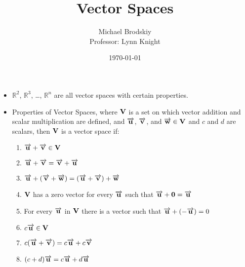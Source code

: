 \documentclass[12pt]{article}
\title{Vector Spaces}
\date{\today}
\author{Michael Brodskiy\\ \small Professor: Lynn Knight}
\begin{document}
\maketitle

\begin{itemize}

  \item $\mathbb{R}^2$, $\mathbb{R}^3$, \dots, $\mathbb{R}^n$ are all vector spaces with certain properties.

  \item Properties of Vector Spaces, where $\bold{V}$ is a set on which vector addition and scalar multiplication are defined, and $\overrightarrow{\bold{u}}$, $\overrightarrow{\bold{v}}$, and $\overrightarrow{\bold{w}} \in \bold{V}$ and $c$ and $d$ are scalars, then $\bold{V}$ is a vector space if:

    \begin{enumerate}

      \item $\overrightarrow{\bold{u}} + \overrightarrow{\bold{v}} \in \bold{V}$

      \item $\overrightarrow{\bold{u}} + \overrightarrow{\bold{v}} = \overrightarrow{\bold{v}} + \overrightarrow{\bold{u}}$

      \item $\overrightarrow{\bold{u}} + (\overrightarrow{\bold{v}} + \overrightarrow{\bold{w}})=(\overrightarrow{\bold{u}} + \overrightarrow{\bold{v}}) + \overrightarrow{\bold{w}}$

      \item  $\bold{V}$ has a zero vector for every $\overrightarrow{\bold{u}}$ such that $\overrightarrow{\bold{u}} + \bold{0} =\overrightarrow{\bold{u}}$

      \item For every $\overrightarrow{\bold{u}}$ in $\bold{V}$ there is a vector such that $\overrightarrow{\bold{u}} + (-\overrightarrow{\bold{u}})=0$

      \item $c\overrightarrow{\bold{u}} \in \bold{V}$ 

      \item $c(\overrightarrow{\bold{u}} + \overrightarrow{\bold{v}})= c\overrightarrow{\bold{u}}+c\overrightarrow{\bold{v}}$

      \item $(c+d)\overrightarrow{\bold{u}}=c\overrightarrow{\bold{u}}+d\overrightarrow{\bold{u}}$


\end{enumerate}
\end{itemize}
\end{document}

